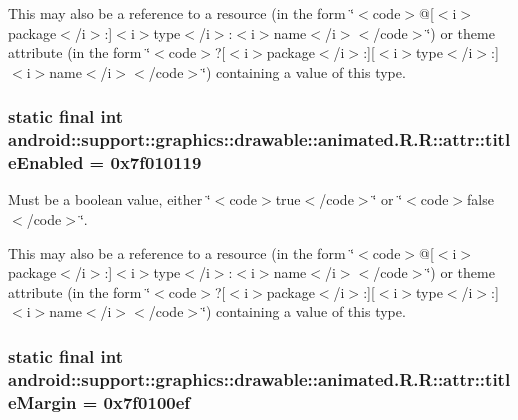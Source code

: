 This may also be a reference to a resource (in the form \char`\"{}$<$code$>$@\mbox{[}$<$i$>$package$<$/i$>$:\mbox{]}$<$i$>$type$<$/i$>$:$<$i$>$name$<$/i$>$$<$/code$>$\char`\"{}) or theme attribute (in the form \char`\"{}$<$code$>$?\mbox{[}$<$i$>$package$<$/i$>$:\mbox{]}\mbox{[}$<$i$>$type$<$/i$>$:\mbox{]}$<$i$>$name$<$/i$>$$<$/code$>$\char`\"{}) containing a value of this type. \hypertarget{classandroid_1_1support_1_1graphics_1_1drawable_1_1animated_1_1_r_1_1attr_86525ab691b40f300d06f09f0c0c210e}{
\subsubsection[{titleEnabled}]{\setlength{\rightskip}{0pt plus 5cm}static final int android::support::graphics::drawable::animated.R.R::attr::titleEnabled = 0x7f010119}}
\label{classandroid_1_1support_1_1graphics_1_1drawable_1_1animated_1_1_r_1_1attr_86525ab691b40f300d06f09f0c0c210e}


Must be a boolean value, either \char`\"{}$<$code$>$true$<$/code$>$\char`\"{} or \char`\"{}$<$code$>$false$<$/code$>$\char`\"{}. 

This may also be a reference to a resource (in the form \char`\"{}$<$code$>$@\mbox{[}$<$i$>$package$<$/i$>$:\mbox{]}$<$i$>$type$<$/i$>$:$<$i$>$name$<$/i$>$$<$/code$>$\char`\"{}) or theme attribute (in the form \char`\"{}$<$code$>$?\mbox{[}$<$i$>$package$<$/i$>$:\mbox{]}\mbox{[}$<$i$>$type$<$/i$>$:\mbox{]}$<$i$>$name$<$/i$>$$<$/code$>$\char`\"{}) containing a value of this type. \hypertarget{classandroid_1_1support_1_1graphics_1_1drawable_1_1animated_1_1_r_1_1attr_cb940d4732a0526cbb87cc288e82bf2f}{
\subsubsection[{titleMargin}]{\setlength{\rightskip}{0pt plus 5cm}static final int android::support::graphics::drawable::animated.R.R::attr::titleMargin = 0x7f0100ef}}
\label{classandroid_1_1support_1_1graphics_1_1drawable_1_1animated_1_1_r_1_1attr_cb940d4732a0526cbb87cc288e82bf2f}


